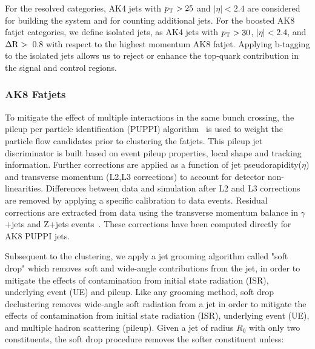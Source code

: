 For the resolved categories, AK4 jets with $p_{\mathrm{T}} > 25$ and $|\eta|<2.4$ are considered for building the \HBB system and for counting additional jets.
For the boosted AK8 fatjet categories, we define isolated jets, as AK4 jets with $p_{\mathrm{T}} > 30$, $|\eta|<2.4$, and $\Delta {\rm R}>$~0.8 with respect to the highest
momentum AK8 fatjet. Applying b-tagging to the isolated jets allows us to reject or enhance the top-quark contribution in the signal and control regions.

\subsubsection{AK8 Fatjets}
To mitigate the effect of multiple interactions in the same bunch crossing, the pileup per particle identification (PUPPI) algorithm~\cite{Bertolini:2014bba} 
is used to weight the particle flow candidates prior to clustering the fatjets. This pileup jet discriminator is built based on event pileup properties, local shape and tracking information.
Further corrections are applied as a function of jet pseudorapidity($\eta$) and transverse momentum (L2,L3 corrections) to account for detector non-linearities.
Differences between data and simulation after L2 and L3 corrections are removed by applying a specific calibration to data events. Residual corrections are extracted from data using
the transverse momentum balance in $\gamma$+jets and Z+jets events~\cite{Chatrchyan:2011ds}. These corrections have been computed directly for AK8 PUPPI jets.

Subsequent to the clustering, we apply a jet grooming algorithm called "soft drop" which removes soft and wide-angle contributions from the jet, in order to mitigate the effects of contamination from initial state radiation (ISR), underlying event (UE) and pileup\cite{Larkoski:2014wba}.
Like any grooming method, soft drop declustering removes wide-angle soft radiation from a jet in order to mitigate the effects of contamination from initial state radiation (ISR), underlying event (UE), and multiple hadron scattering (pileup). Given a jet of radius $R_0$ with only two constituents, the soft drop procedure removes the softer constituent unless:

